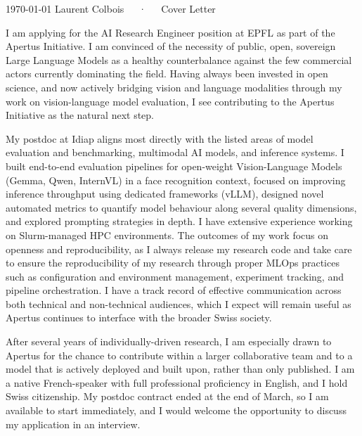 \documentclass[11pt, a4paper]{awesome-cv}
\begin{document}
\makecvheader[R]

\makecvfooter
  {\today}
  {Laurent Colbois~~~·~~~Cover Letter}
  {}

\makelettertitle

\begin{cvletter}
I am applying for the AI Research Engineer position at EPFL as part of the Apertus Initiative. I am convinced of the necessity of public, open, sovereign Large Language Models as a healthy counterbalance against the few commercial actors currently dominating the field. Having always been invested in open science, and now actively bridging vision and language modalities through my work on vision-language model evaluation, I see contributing to the Apertus Initiative as the natural next step.

My postdoc at Idiap aligns most directly with the listed areas of model evaluation and benchmarking, multimodal AI models, and inference systems. I built end-to-end evaluation pipelines for open-weight Vision-Language Models (Gemma, Qwen, InternVL) in a face recognition context, focused on improving inference throughput using dedicated frameworks (vLLM), designed novel automated metrics to quantify model behaviour along several quality dimensions, and explored prompting strategies in depth. I have extensive experience working on Slurm-managed HPC environments.  The outcomes of my work focus on openness and reproducibility, as I always release my research code and take care to ensure the reproducibility of my research through proper MLOps practices such as configuration and environment management, experiment tracking, and pipeline orchestration. I have a track record of effective communication across both technical and non-technical audiences, which I expect will remain useful as Apertus continues to interface with the broader Swiss society. 

After several years of individually-driven research, I am especially drawn to Apertus for the chance to contribute within a larger collaborative team and to a model that is actively deployed and built upon, rather than only published.
I am a native French-speaker with full professional proficiency in English, and I hold Swiss citizenship. My postdoc contract ended at the end of March, so I am
available to start immediately, and I would welcome the opportunity to discuss my application in an interview.


\end{cvletter}


\makeletterclosing
\end{document}
